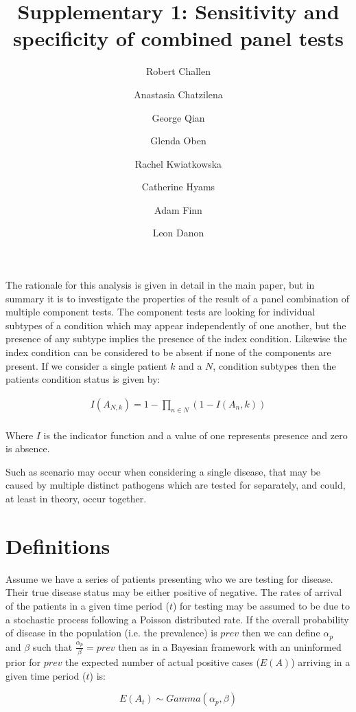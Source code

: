 \documentclass[a4paper, 12pt, twoside]{article}
\title{Supplementary 1: Sensitivity and specificity of combined panel tests}
\author[1]{Robert Challen}
\author[1]{Anastasia Chatzilena}
\author[1]{George Qian}
\author[1]{Glenda Oben}
\author[2,3]{Rachel Kwiatkowska}
\author[1]{Catherine Hyams}
\author[1]{Adam Finn}
\author[1]{Leon Danon}
\affil[1]{Bristol Vaccine Centre, University of Bristol. UK.}
\affil[2]{Population Health Sciences, University of Bristol. UK.}
\affil[3]{NIHR Health Protection Unit in Behavioural Science and Evaluation, University of Bristol. UK.}
\date{}                     %
\let\Oldsection\section
\renewcommand{\section}{\FloatBarrier\Oldsection}
\begin{document}
\maketitle

The rationale for this analysis is given in detail in the main paper, but in summary it is to investigate the properties of the result of a panel combination of multiple component tests. The component tests are looking for individual subtypes of a condition which may appear independently of one another, but the presence of any subtype implies the presence of the index condition. Likewise the index condition can be considered to be absent if none of the components are present. If we consider a single patient $k$ and a $N$, condition subtypes then the patients condition status is given by:

\begin{equation*}
\begin{aligned}
I(A_{N,k}) = 1-\prod_{n \in N}{(1-I(A_n,k))} \\
\end{aligned}
\end{equation*}

Where \(I\) is the indicator function and a value of one represents presence and zero is absence.

Such as scenario may occur when considering a single disease, that may be caused by multiple distinct pathogens which are tested for separately, and could, at least in theory, occur together.

\section{Definitions}

Assume we have a series of patients presenting who we are testing for disease. Their true disease status
may be either positive of negative. The rates of arrival of the patients in a given time period (\(t\)) for testing may be assumed to be due to a stochastic process following a Poisson distributed rate. If the overall probability of disease in the population (i.e. the prevalence) is \(prev\)
then we can define \(\alpha_p\) and \(\beta\) such that \(\frac{\alpha_p}{\beta} = prev\) then as in a Bayesian framework with an uninformed prior for \(prev\) the expected number of actual positive cases (\(E(A)\)) arriving in a given time period (\(t\)) is:

\begin{equation*}
E(A_t) \sim Gamma(\alpha_p, \beta)
\end{equation*}
\end{document}
